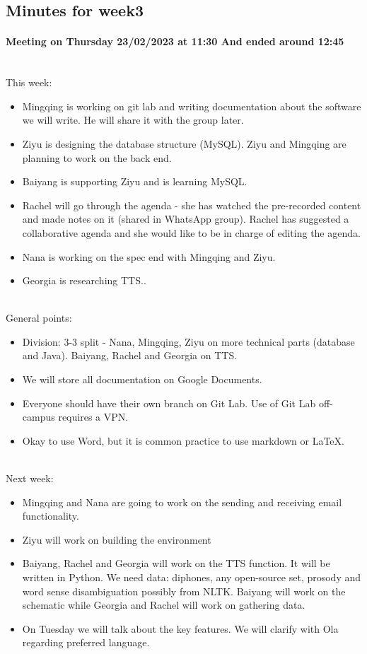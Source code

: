\documentclass{article}
\begin{document}
\subsection{Minutes for week3}
\paragraph{Meeting on Thursday 23/02/2023 at 11:30
And ended around 12:45
} \hspace{0pt}\\
This week: \\
\begin{itemize}
    \item Mingqing is working on git lab and writing documentation about the software we will write. He will share it with the group later.
    \item Ziyu is designing the database structure (MySQL). Ziyu and Mingqing are planning to work on the back end.
    \item Baiyang is supporting Ziyu and is learning MySQL.
    \item Rachel will go through the agenda - she has watched the pre-recorded content and made notes on it (shared in WhatsApp group). Rachel has suggested a collaborative agenda and she would like to be in charge of editing the agenda.
    \item Nana is working on the spec end with Mingqing and Ziyu.
    \item Georgia is researching TTS..
\end{itemize} \\
General points: \\

\begin{itemize}
    \item Division: 3-3 split - Nana, Mingqing, Ziyu on more technical parts (database and Java). Baiyang, Rachel and Georgia on TTS.
    \item We will store all documentation on Google Documents.
    \item Everyone should have their own branch on Git Lab. Use of Git Lab off-campus requires a VPN.
    \item Okay to use Word, but it is common practice to use markdown or LaTeX.
\end{itemize} \\

Next week: \\

\begin{itemize}
    \item Mingqing and Nana are going to work on the sending and receiving email functionality.
    \item Ziyu will work on building the environment
    \item Baiyang, Rachel and Georgia will work on the TTS function. It will be written in Python. We need data: diphones, any open-source set, prosody and word sense disambiguation possibly from NLTK. Baiyang will work on the schematic while Georgia and Rachel will work on gathering data.
    \item On Tuesday we will talk about the key features. We will clarify with Ola regarding preferred language.
\end{itemize}
\end{document}
